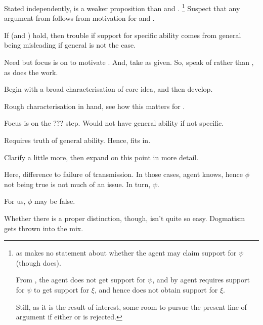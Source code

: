 \begin{note}
    Stated independently, \nIp{} is a weaker proposition than \nI{} and \nIm{}.\nolinebreak
    \footnote{
      as \nIp{} makes no statement about whether the agent may claim support for \(\psi\) (though \nI{} does).

      From \nI{}, the agent does not get support for \(\psi\), and by \nIm{} agent requires support for \(\psi\) to get support for \(\xi\), and hence does not obtain support for \(\xi\).

    Still, as it is the result of interest, some room to pursue the present line of argument if either \nI{} or \nIm{} is rejected.
    }
    Suspect that any argument from \nIp{} follows from motivation for \nI{} and \nIm{}.

  If \nI{} (and \nIm{}) hold, then trouble if support for specific ability comes from general being misleading if general is not the case.
\end{note}

\begin{note}
  Need \nIp{} but focus is on \nI{} to motivate \nIp{}.
  And, take \nIm{} as given.
  So, speak of \nI{} rather than \nIp{}, as \nI{} does the work.

  Begin with a broad characterisation of core idea, and then develop.
\end{note}

\begin{note}
  Rough characterisation in hand, see how this matters for \AR{}.

  Focus is on the ??? step.
  Would not have general ability if not specific.

  Requires truth of general ability.
  Hence, fits in.

  Clarify a little more, then expand on this point in more detail.
\end{note}

\begin{note}
  Here, difference to failure of transmission.
  In those cases, agent knows, hence \(\phi\) not being true is not much of an issue.
  In turn, \(\psi\).

  For us, \(\phi\) may be false.

  Whether there is a proper distinction, though, isn't quite so easy.
  Dogmatism gets thrown into the mix.
\end{note}


